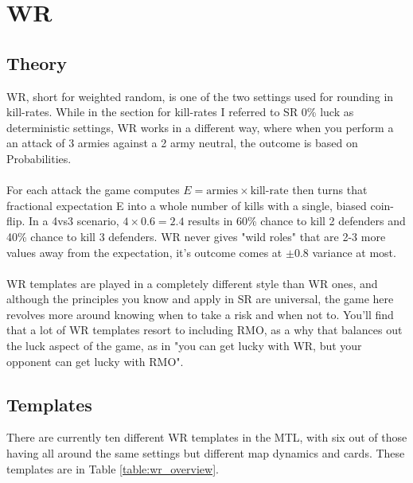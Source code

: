 \section{WR}

\subsection{Theory}

WR, short for weighted random, is one of the two settings used for rounding in kill-rates. While in the section for kill-rates I referred to SR 0\% luck as deterministic settings, WR works in a different way, where when you perform a an attack of 3 armies against a 2 army neutral, the outcome is based on Probabilities.
\\
\\
For each attack the game computes $E=\text{armies} \times \text{kill-rate}$ then turns that fractional expectation E into a whole number of kills with a single, biased coin-flip. In a 4vs3 scenario, $4\times 0.6 = 2.4$ results in 60\% chance to kill 2 defenders and 40\% chance to kill 3 defenders. WR never gives "wild roles" that are 2-3 more values away from the expectation, it's outcome comes at $\pm 0.8$ variance at most.
\\
\\
WR templates are played in a completely different style than WR ones, and although the principles you know and apply in SR are universal, the game here revolves more around knowing when to take a risk and when not to. You'll find that a lot of WR templates resort to including RMO, as a why that balances out the luck aspect of the game, as in "you can get lucky with WR, but your opponent can get lucky with RMO".

\subsection{Templates}

There are currently ten different WR templates in the MTL, with six out of those having all around the same settings but different map dynamics and cards. These templates are in Table \ref{table:wr_overview}.

